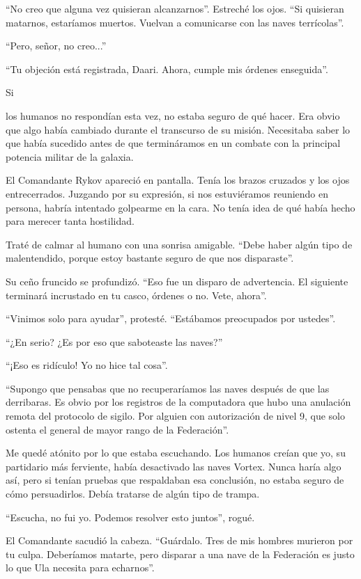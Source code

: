 \documentclass[spanish,12pt,a4paper,oneside,titlepage]{book}
\begin{document}
    ``No creo que alguna vez quisieran alcanzarnos''. Estreché los ojos. ``Si quisieran matarnos, estaríamos muertos. Vuelvan a comunicarse con las naves terrícolas''.

    ``Pero, señor, no creo...''

    ``Tu objeción está registrada, Daari. Ahora, cumple mis órdenes enseguida''.

    Si

    los humanos no respondían esta vez, no estaba seguro de qué hacer. Era obvio que algo había cambiado durante el transcurso de su misión. Necesitaba saber lo que había sucedido antes de que termináramos en un combate con la principal potencia militar de la galaxia.

    El Comandante Rykov apareció en pantalla. Tenía los brazos cruzados y los ojos entrecerrados. Juzgando por su expresión, si nos estuviéramos reuniendo en persona, habría intentado golpearme en la cara. No tenía idea de qué había hecho para merecer tanta hostilidad.

    Traté de calmar al humano con una sonrisa amigable. ``Debe haber algún tipo de malentendido, porque estoy bastante seguro de que nos disparaste''.

    Su ceño fruncido se profundizó. ``Eso fue un disparo de advertencia. El siguiente terminará incrustado en tu casco, órdenes o no. Vete, ahora''.

    ``Vinimos solo para ayudar'', protesté. ``Estábamos preocupados por ustedes''.

    ``¿En serio? ¿Es por eso que saboteaste las naves?''

    ``¡Eso es ridículo! Yo no hice tal cosa''.

    ``Supongo que pensabas que no recuperaríamos las naves después de que las derribaras. Es obvio por los registros de la computadora que hubo una anulación remota del protocolo de sigilo. Por alguien con autorización de nivel 9, que solo ostenta el general de mayor rango de la Federación''.

    Me quedé atónito por lo que estaba escuchando. Los humanos creían que yo, su partidario más ferviente, había desactivado las naves Vortex. Nunca haría algo así, pero si tenían pruebas que respaldaban esa conclusión, no estaba seguro de cómo persuadirlos. Debía tratarse de algún tipo de trampa.

    ``Escucha, no fui yo. Podemos resolver esto juntos'', rogué.

    El Comandante sacudió la cabeza. ``Guárdalo. Tres de mis hombres murieron por tu culpa. Deberíamos matarte, pero disparar a una nave de la Federación es justo lo que Ula necesita para echarnos''.
\end{document}
